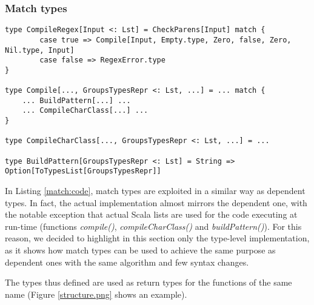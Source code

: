 \subsubsection{Match types}

\begin{lstlisting}[style=myScalastyle, caption={Match types prototypes.}, captionpos=b, label={match:code}]
type CompileRegex[Input <: Lst] = CheckParens[Input] match {
        case true => Compile[Input, Empty.type, Zero, false, Zero, Nil.type, Input]
        case false => RegexError.type
}

type Compile[..., GroupsTypesRepr <: Lst, ...] = ... match {
    ... BuildPattern[...] ... 
    ... CompileCharClass[...] ...
}

type CompileCharClass[..., GroupsTypesRepr <: Lst, ...] = ...

type BuildPattern[GroupsTypesRepr <: Lst] = String => Option[ToTypesList[GroupsTypesRepr]]
\end{lstlisting}

In Listing \ref{match:code}, match types are exploited in a similar way as dependent types. In fact, the actual implementation almost mirrors the dependent one, with the notable exception that actual Scala lists are used for the code executing at run-time (functions \textit{compile()}, \textit{compileCharClass()} and \textit{buildPattern()}). For this reason, we decided to highlight in this section only the type-level implementation, as it shows how match types can be used to achieve the same purpose as dependent ones with the same algorithm and few syntax changes.

The types thus defined are used as return types for the functions of the same name (Figure \ref{structure.png} shows an example).
